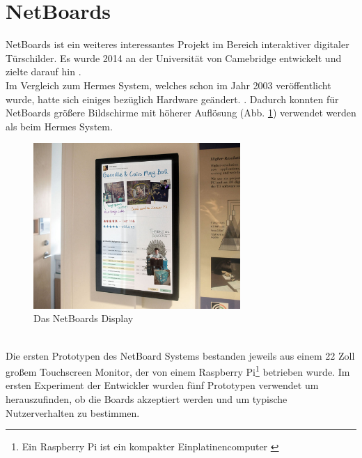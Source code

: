 \section{NetBoards}
NetBoards\cite{wood:2014,netboards:website} ist ein weiteres interessantes Projekt im Bereich interaktiver digitaler Türschilder. Es wurde 2014 an der Universität von Camebridge entwickelt und zielte darauf hin \cite{wood:2014}.\\
Im Vergleich zum Hermes System, welches schon im Jahr 2003 veröffentlicht wurde, hatte sich einiges bezüglich Hardware geändert. \cite{wood:2014}.
Dadurch konnten für NetBoards größere Bildschirme mit höherer Auflösung (Abb. \ref{img:netBoardsDisplay}) verwendet werden als beim Hermes System.
\begin{figure}[h!]
  \centering
    \includegraphics[width=0.7\textwidth]{./img/netBoards_display.png}
  \caption{Das NetBoards Display\cite{wood:2014}}
  \label{img:netBoardsDisplay}
\end{figure}
\\
Die ersten Prototypen des NetBoard Systems bestanden jeweils aus einem 22 Zoll großem Touchscreen Monitor, der von einem Raspberry Pi\footnote{Ein Raspberry Pi ist ein kompakter Einplatinencomputer \cite{raspberrypi:website}} betrieben wurde.
Im ersten Experiment der Entwickler wurden fünf Prototypen verwendet um herauszufinden, ob die Boards akzeptiert werden und um typische Nutzerverhalten zu bestimmen.
\cite{wood:2014}
